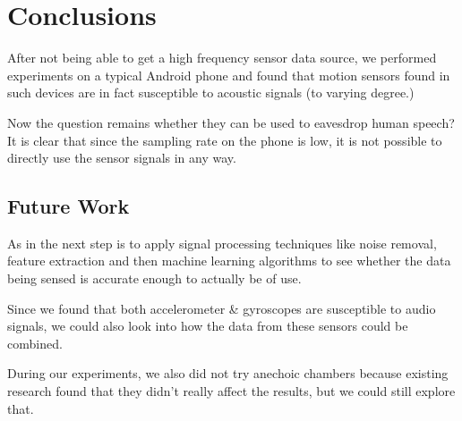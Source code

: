 \chapter{Conclusions}

After not being able to get a high frequency sensor data source, we performed experiments on a typical Android phone and found that motion sensors found in such devices are in fact susceptible to acoustic signals (to varying degree.)

Now the question remains whether they can be used to eavesdrop human speech? It is clear that since the sampling rate on the phone is low, it is not possible to directly use the sensor signals in any way.

\section{Future Work}

As in \cite{gyrophone} the next step is to apply signal processing techniques like noise removal, feature extraction and then machine learning algorithms to see whether the data being sensed is accurate enough to actually be of use.

Since we found that both accelerometer \& gyroscopes are susceptible to audio signals, we could also look into how the data from these sensors could be combined.

During our experiments, we also did not try anechoic chambers because existing research \cite{gyrophone} found that they didn’t really affect the results, but we could still explore that.



